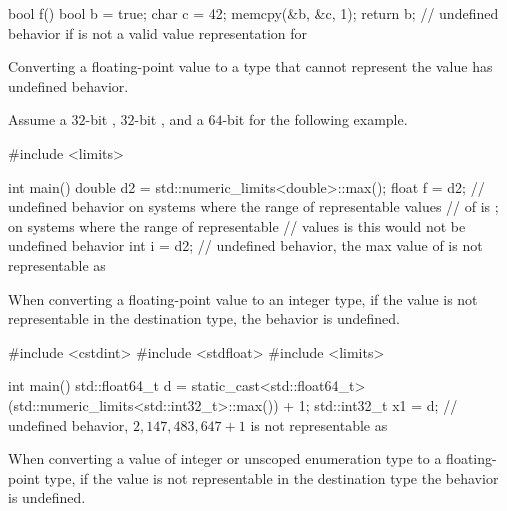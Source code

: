 \pnum
\begin{example}
\begin{codeblock}
bool f() {
  bool b = true;
  char c = 42;
  memcpy(&b, &c, 1);
  return b;         // undefined behavior if  is not a valid value representation for 
}
\end{codeblock}
\end{example}


\pnum
Converting a floating-point value to a type
that cannot represent the value has undefined behavior.

\pnum
\begin{example}
Assume a $32$-bit ,
$32$-bit ,
and a
$64$-bit 
for the following example.
\begin{codeblock}
#include <limits>

int main() {
  double d2 = std::numeric_limits<double>::max();
  float f = d2; // undefined behavior on systems where the range of representable values
                // of  is ; on systems where the range of representable
                // values is  this would not be undefined behavior
  int i = d2;   // undefined behavior, the max value of  is not representable as 
}
\end{codeblock}
\end{example}


\pnum
When converting a floating-point value to an integer type, if
the value is not representable in the destination type, the behavior is undefined.

\pnum
\begin{example}
\begin{codeblock}
#include <cstdint>
#include <stdfloat>
#include <limits>

int main() {
  std::float64_t d  = static_cast<std::float64_t>(std::numeric_limits<std::int32_t>::max()) + 1;
  std::int32_t   x1 = d;    // undefined behavior, $2,147,483,647 + 1$ is not representable as 
}
\end{codeblock}
\end{example}


\pnum
When converting a value of integer or unscoped enumeration type
to a floating-point type,
if the value is not representable in the destination type
the behavior is undefined.


